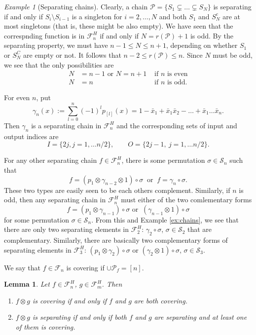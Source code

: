 \documentclass[12pt]{article}
\newtheorem{lemma}{Lemma}
\theoremstyle{definition}
\theoremstyle{remark}
\newtheorem{example}{Example}
\def\perm{\mathcal S}
\def\Pe{\mathcal P}
\def\Fe{\mathcal F}
\begin{document}
\begin{example}[Separating chains] Clearly, a chain $\Pe=\{S_1\subsetneq \dots \subsetneq
S_N\}$ is
separating if and only if  $S_i\setminus S_{i-1}$ is a singleton for $i=2,\dots, N$ and
both $S_1$ and $S_N^c$ are at most singletons (that is, these might be also empty). 
We have seen that the correspnding function is in $\Fe_n^H$ if and only if $N=r(\Pe)+1$ is
odd. By the separating property, we must have $n-1\le N\le n+1$, depending on whether
$S_1$ or $S_N^C$ are empty or not.
It follows that $n-2\le r(\Pe)\le n$. Since $N$ must be  odd, we see that the only
possibilities are
\begin{align*}
N&=n-1 \text{ or } N=n+1  & \text{ if $n$ is even}\\
N&=n & \text{ if $n$ is odd}.
\end{align*}

For even $n$, put
\[
\gamma_n(x):=\sum_{l=0}^n (-1)^lp_{[l]}(x)=1-\bar x_1+\bar x_1\bar x_2-\dots +\bar x_1\dots \bar x_n.
\]
Then $\gamma_n$  is a separating chain in $\Fe_n^H$ and the corresponding sets of input and output
indices  are
\[
I=\{2j, j=1,\dots n/2\},\qquad O=\{2j-1,\ j=1,\dots n/2\}.
\]

For any other separating
chain $f\in \Fe_n^H$, there is some permutation $\sigma\in \perm_n$ such that
\[
f=(p_1\otimes \gamma_{n-2}\otimes 1)\circ \sigma\ \text{ or }\  f=\gamma_n\circ \sigma.
\]
These two types are easily seen to be each others complement.
Similarly, if $n$ is odd, then any separating chain in $\Fe_n^H$  must either of the two
comlementary  forms
\[
f=(p_1\otimes \gamma_{n-1})\circ \sigma  \text{ or }\  (\gamma_{n-1}\otimes 1)\circ
\sigma
\]
for some permutation $\sigma\in \perm_n$.  From this and Example \ref{ex:chains}, we see
that there are  only two separating elements in $\Fe_2^H$:  $\gamma_2\circ \sigma$,
$\sigma\in \perm_2$ that are complementary. Similarly, there are basically 
two complementary forms of  separating elements in $\Fe_3^H$: 
$(p_1\otimes \gamma_2)\circ\sigma$ or $(\gamma_2\otimes 1)\circ\sigma$, $\sigma\in
\perm_3$. 



\end{example}

We say that $f\in \Fe_n$ is covering if $\cup \Pe_f=[n]$. \begin{lemma}\label{lemma:separating_product}
Let $f\in \Fe_n^H$, $g\in \Fe_m^H$. Then 
\begin{enumerate}
\item $f\otimes g$ is covering if and only if  $f$ and $g$ are both covering.
\item $f\otimes g$ is separating if and only if both $f$ and $g$ are separating and at
least one of them is covering.
\end{enumerate}


\end{lemma}
\end{document}
